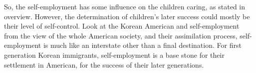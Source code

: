 So, the self-employment has some influence on the children caring, as stated in
overview. However, the determination of children's later success could mostly
be their level of self-control. Look at the Korean American and self-employment
from the view of the whole American society, and their assimilation process,
self-employment is much like an interstate other than a final destination. For
first generation Korean immigrants, self-employment is a base stone for their
settlement in American, for the success of their later generations.
